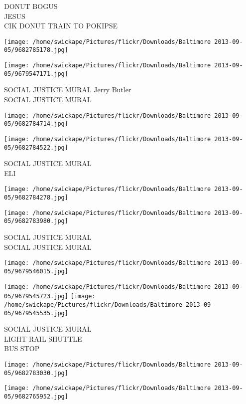 \documentclass[10pt,letterpaper]{article}
\begin{document}
DONUT BOGUS\\
JESUS\\
CIK DONUT TRAIN TO POKIPSE
\pagebreak

\texttt{[image: /home/swickape/Pictures/flickr/Downloads/Baltimore 2013-09-05/9682785178.jpg]}

\vspace{0.25in}
\texttt{[image: /home/swickape/Pictures/flickr/Downloads/Baltimore 2013-09-05/9679547171.jpg]}

SOCIAL JUSTICE MURAL Jerry Butler\\
SOCIAL JUSTICE MURAL
\pagebreak

\texttt{[image: /home/swickape/Pictures/flickr/Downloads/Baltimore 2013-09-05/9682784714.jpg]}

\vspace{0.25in}
\texttt{[image: /home/swickape/Pictures/flickr/Downloads/Baltimore 2013-09-05/9682784522.jpg]}

SOCIAL JUSTICE MURAL\\
ELI
\pagebreak

\texttt{[image: /home/swickape/Pictures/flickr/Downloads/Baltimore 2013-09-05/9682784278.jpg]}

\vspace{0.25in}
\texttt{[image: /home/swickape/Pictures/flickr/Downloads/Baltimore 2013-09-05/9682783980.jpg]}

SOCIAL JUSTICE MURAL\\
SOCIAL JUSTICE MURAL
\pagebreak

\texttt{[image: /home/swickape/Pictures/flickr/Downloads/Baltimore 2013-09-05/9679546015.jpg]}

\vspace{0.25in}
\texttt{[image: /home/swickape/Pictures/flickr/Downloads/Baltimore 2013-09-05/9679545723.jpg]}
\texttt{[image: /home/swickape/Pictures/flickr/Downloads/Baltimore 2013-09-05/9679545535.jpg]}

SOCIAL JUSTICE MURAL\\
LIGHT RAIL SHUTTLE\\
BUS STOP
\pagebreak

\texttt{[image: /home/swickape/Pictures/flickr/Downloads/Baltimore 2013-09-05/9682783030.jpg]}

\vspace{0.25in}
\texttt{[image: /home/swickape/Pictures/flickr/Downloads/Baltimore 2013-09-05/9682765952.jpg]}
\end{document}
